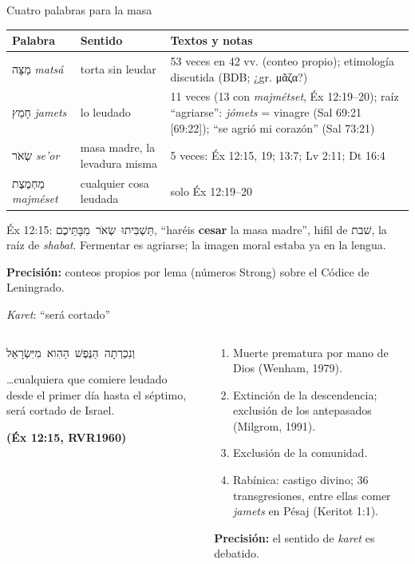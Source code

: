 \documentclass[hyperref={bookmarks=false},aspectratio=169]{beamer}
\newcommand{\heb}[1]{\mbox{\foreignlanguage{hebrew}{#1}}}
\newcommand{\grc}[1]{\foreignlanguage{ancientgreek}{#1}}
\newcommand{\fuente}[1]{\par\hfill{\upshape\bfseries\footnotesize\textcolor{tierraroja}{#1}}}
\newcommand{\destacar}[1]{\textbf{\textcolor{tierraroja}{#1}}}
\newcommand{\precision}[1]{{\footnotesize\color{sepia}\textbf{Precisión:} #1}}
\begin{document}
\begin{frame}{Cuatro palabras para la masa}
\scriptsize\renewcommand{\arraystretch}{1.15}
\begin{tabular}{@{}L{2.4cm}L{3.0cm}L{6.6cm}@{}}
\toprule
\textbf{Palabra} & \textbf{Sentido} & \textbf{Textos y notas} \\ \midrule
\heb{מַצָּה} \emph{matsá} & torta sin leudar & 53 veces en 42 vv. (conteo propio); etimología discutida (BDB; ¿gr. \grc{μᾶζα}?) \\
\heb{חָמֵץ} \emph{jamets} & lo leudado & 11 veces (13 con \emph{majmétset}, Éx 12:19--20); raíz ``agriarse'': \emph{jómets} = vinagre (Sal 69:21 [69:22]); ``se agrió mi corazón'' (Sal 73:21) \\
\heb{שְׂאֹר} \emph{se'or} & masa madre, la levadura misma & 5 veces: Éx 12:15, 19; 13:7; Lv 2:11; Dt 16:4 \\
\heb{מַחְמֶצֶת} \emph{majméset} & cualquier cosa leudada & solo Éx 12:19--20 \\
\bottomrule
\end{tabular}\par\medskip
\small Éx 12:15: \heb{תַּשְׁבִּיתוּ שְׂאֹר מִבָּתֵּיכֶם}, ``haréis \destacar{cesar} la masa madre'', hifil de \heb{שׁבת}, la raíz de \emph{shabat}. Fermentar es agriarse; la imagen moral estaba ya en la lengua.\par
\precision{conteos propios por lema (números Strong) sobre el Códice de Leningrado.}
\end{frame}

\begin{frame}{\emph{Karet}: ``será cortado''}
\begin{columns}[t,onlytextwidth]
\begin{column}{0.46\textwidth}
\centering\heb{וְנִכְרְתָה הַנֶּפֶשׁ הַהִוא מִיִּשְׂרָאֵל}
\begin{cita}\ldots{}cualquiera que comiere leudado desde el primer día hasta el séptimo, será cortado de Israel.\fuente{(Éx 12:15, RVR1960)}\end{cita}
\end{column}
\begin{column}{0.52\textwidth}\scriptsize
\begin{enumerate}
\item Muerte prematura por mano de Dios (Wenham, 1979).
\item Extinción de la descendencia; exclusión de los antepasados (Milgrom, 1991).
\item Exclusión de la comunidad.
\item Rabínica: castigo divino; 36 transgresiones, entre ellas comer \emph{jamets} en Pésaj (Keritot 1:1).
\end{enumerate}
\precision{el sentido de \emph{karet} es debatido.}
\end{column}
\end{columns}
\end{frame}
\end{document}
